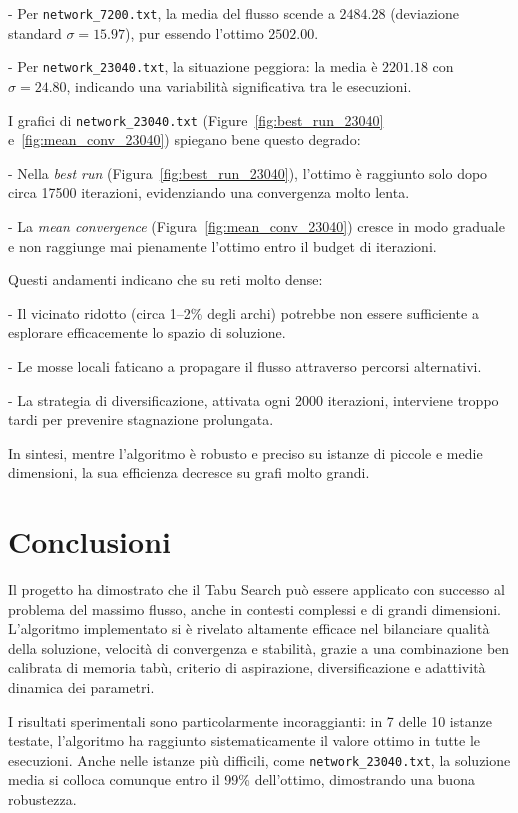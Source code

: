 \documentclass[12pt,a4paper]{article}
\begin{document}
    
- Per \texttt{network\_7200.txt}, la media del flusso scende a $2484.28$ (deviazione standard $\sigma = 15.97$), pur essendo l’ottimo $2502.00$.
    
- Per \texttt{network\_23040.txt}, la situazione peggiora: la media è $2201.18$ con $\sigma = 24.80$, indicando una variabilità significativa tra le esecuzioni.


I grafici di \texttt{network\_23040.txt} (Figure~\ref{fig:best_run_23040} e~\ref{fig:mean_conv_23040}) spiegano bene questo degrado:

    
- Nella \textit{best run} (Figura~\ref{fig:best_run_23040}), l’ottimo è raggiunto solo dopo circa 17500 iterazioni, evidenziando una convergenza molto lenta.
    
- La \textit{mean convergence} (Figura~\ref{fig:mean_conv_23040}) cresce in modo graduale e non raggiunge mai pienamente l’ottimo entro il budget di iterazioni.


Questi andamenti indicano che su reti molto dense:

    
- Il vicinato ridotto (circa 1–2\% degli archi) potrebbe non essere sufficiente a esplorare efficacemente lo spazio di soluzione.
    
- Le mosse locali faticano a propagare il flusso attraverso percorsi alternativi.
    
- La strategia di diversificazione, attivata ogni 2000 iterazioni, interviene troppo tardi per prevenire stagnazione prolungata.


In sintesi, mentre l’algoritmo è robusto e preciso su istanze di piccole e medie dimensioni, la sua efficienza decresce su grafi molto grandi.

\section{Conclusioni}

Il progetto ha dimostrato che il Tabu Search può essere applicato con successo al problema del massimo flusso, anche in contesti complessi e di grandi dimensioni. L’algoritmo implementato si è rivelato altamente efficace nel bilanciare qualità della soluzione, velocità di convergenza e stabilità, grazie a una combinazione ben calibrata di memoria tabù, criterio di aspirazione, diversificazione e adattività dinamica dei parametri.

I risultati sperimentali sono particolarmente incoraggianti: in 7 delle 10 istanze testate, l’algoritmo ha raggiunto sistematicamente il valore ottimo in tutte le esecuzioni. Anche nelle istanze più difficili, come \texttt{network\_23040.txt}, la soluzione media si colloca comunque entro il 99\% dell’ottimo, dimostrando una buona robustezza.
\end{document}
